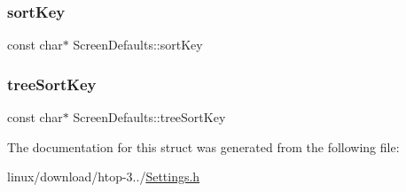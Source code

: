 \mbox{\label{structScreenDefaults_a9d97c3f22fecadae09617ccee6b2a916}} 
\subsubsection{\texorpdfstring{sort\+Key}{sortKey}}
{\footnotesize\ttfamily const char$\ast$ Screen\+Defaults\+::sort\+Key}

\mbox{\label{structScreenDefaults_af74a01c927b7bf683d35bd3e9bb6c99a}} 
\subsubsection{\texorpdfstring{tree\+Sort\+Key}{treeSortKey}}
{\footnotesize\ttfamily const char$\ast$ Screen\+Defaults\+::tree\+Sort\+Key}



The documentation for this struct was generated from the following file\+:\begin{DoxyCompactItemize}
\item 
linux/download/htop-\/3../\hyperlink{Settings_8h}{Settings.\+h}\end{DoxyCompactItemize}
